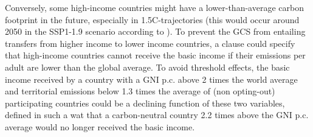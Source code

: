 \documentclass[12pt,english]{article}
\begin{document}
Conversely, some high-income countries might have a lower-than-average carbon footprint in the future, especially in 1.5\textdegree{}C-trajectories (this would occur around 2050 in the SSP1-1.9 scenario according to \citealp{van_vuuren_energy_2017}). To prevent the GCS from entailing transfers from higher income to lower income countries, a clause could specify that high-income countries cannot receive the basic income if their emissions per adult are lower than the global average. To avoid threshold effects, the basic income received by a country with a GNI p.c. above 2 times the world average and territorial emissions below 1.3 times the average of (non opting-out) participating countries could be a declining function of these two variables, defined in such a wat that a carbon-neutral country 2.2 times above the GNI p.c. average would no longer received the basic income. 


\end{document}
